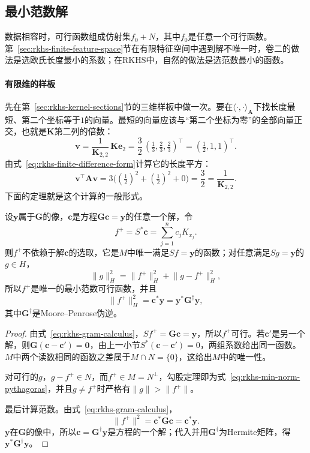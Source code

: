 \subsection{最小范数解}
\label{sec:rkhs-min-norm-solution}

数据相容时，可行函数组成仿射集$f_0+N$，其中$f_0$是任意一个可行函数。第~\ref{sec:rkhs-finite-feature-space}节在有限特征空间中遇到解不唯一时，卷二的做法是选欧氏长度最小的系数；在RKHS中，自然的做法是选范数最小的函数。

\paragraph{有限维的样板}

先在第~\ref{sec:rkhs-kernel-sections}节的三维样板中做一次。要在$\langle\cdot,\cdot\rangle_{\bm A}$下找长度最短、第二个坐标等于$1$的向量。最短的向量应该与“第二个坐标为零”的全部向量正交，也就是$\bm K$第二列的倍数：
\[
\bm v=\frac{1}{\bm K_{2,2}}\,\bm K\bm e_2=\frac32\,(\tfrac13,\tfrac23,\tfrac23)^{\top}=(\tfrac12,1,1)^{\top}.
\]
由式~\eqref{eq:rkhs-finite-difference-form}计算它的长度平方：
\[
\bm v^{\top}\bm A\bm v=3\bigl((\tfrac12)^2+(\tfrac12)^2+0\bigr)=\frac32=\frac1{\bm K_{2,2}}.
\]
下面的定理就是这个计算的一般形式。

\begin{theorem}[最小范数插值]
\label{thm:rkhs-min-norm-interpolation}
设$\bm y$属于$\bm G$的像，$\bm c$是方程$\bm G\bm c=\bm y$的任意一个解，令
\begin{equation}
f^+=S^*\bm c=\sum_{j=1}^nc_jK_{x_j}.
\label{eq:rkhs-min-norm-solution}
\end{equation}
则$f^+$不依赖于解$\bm c$的选取，它是$M$中唯一满足$Sf=\bm y$的函数；对任意满足$Sg=\bm y$的$g\in H$，
\begin{equation}
\lVert g\rVert_H^2=\lVert f^+\rVert_H^2+\lVert g-f^+\rVert_H^2 ,
\label{eq:rkhs-min-norm-pythagoras}
\end{equation}
所以$f^+$是唯一的最小范数可行函数，并且
\begin{equation}
\lVert f^+\rVert_H^2=\bm c^*\bm y=\bm y^*\bm G^{\dagger}\bm y ,
\label{eq:rkhs-min-norm-value}
\end{equation}
其中$\bm G^{\dagger}$是Moore--Penrose伪逆。
\end{theorem}

\begin{proof}
由式~\eqref{eq:rkhs-gram-calculus}，$Sf^+=\bm G\bm c=\bm y$，所以$f^+$可行。若$\bm c'$是另一个解，则$\bm G(\bm c-\bm c')=\bm 0$，由上一小节$S^*(\bm c-\bm c')=0$，两组系数给出同一函数。$M$中两个读数相同的函数之差属于$M\cap N=\{0\}$，这给出$M$中的唯一性。

对可行的$g$，$g-f^+\in N$，而$f^+\in M=N^\perp$，勾股定理即为式~\eqref{eq:rkhs-min-norm-pythagoras}，并且$g\neq f^+$时严格有$\lVert g\rVert>\lVert f^+\rVert$。

最后计算范数。由式~\eqref{eq:rkhs-gram-calculus}，
\[
\lVert f^+\rVert^2=\bm c^*\bm G\bm c=\bm c^*\bm y .
\]
$\bm y$在$\bm G$的像中，所以$\bm c=\bm G^{\dagger}\bm y$是方程的一个解；代入并用$\bm G^{\dagger}$为Hermite矩阵，得$\bm y^*\bm G^{\dagger}\bm y$。
\end{proof}

